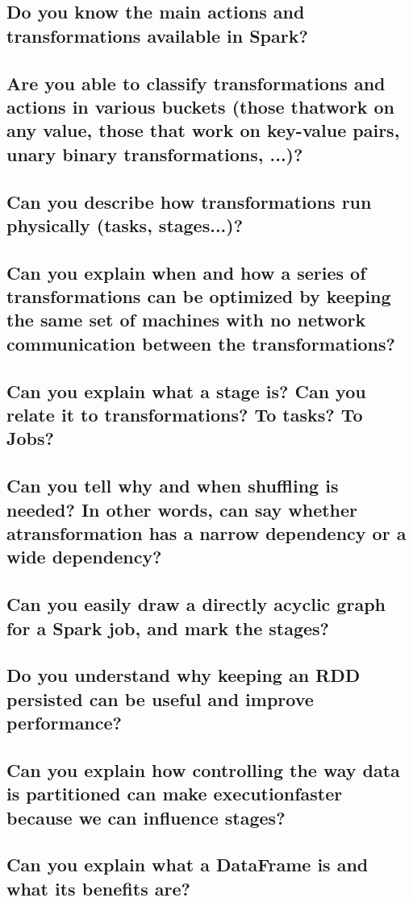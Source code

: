 \documentclass{article}
\begin{document}
\subsection{Do you know the main actions and transformations available in Spark?}
\subsection{Are you able to classify transformations and actions in various buckets (those thatwork on any value, those that work on key-value pairs, unary binary transformations, ...)?}
\subsection{Can you describe how transformations run physically (tasks, stages...)?}
\subsection{Can you explain when and how a series of transformations can be optimized by keeping the same set of machines with no network communication between the transformations?}
\subsection{Can you explain what a stage is? Can you relate it to transformations? To tasks? To Jobs?}
\subsection{Can you tell why and when shuffling is needed? In other words, can say whether atransformation has a narrow dependency or a wide dependency?}
\subsection{Can you easily draw a directly acyclic graph for a Spark job, and mark the stages?}
\subsection{Do you understand why keeping an RDD persisted can be useful and improve performance?}
\subsection{Can you explain how controlling the way data is partitioned can make executionfaster because we can influence stages?}
\subsection{Can you explain what a DataFrame is and what its benefits are?}
\end{document}

